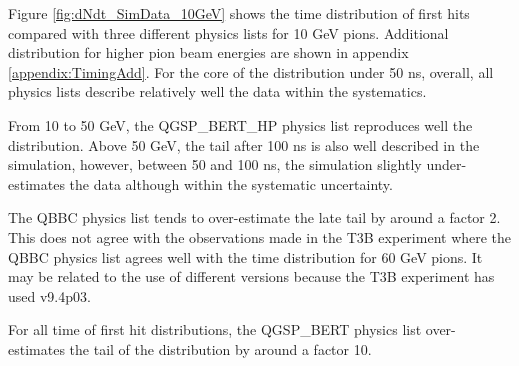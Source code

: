 Figure \ref{fig:dNdt_SimData_10GeV} shows the time distribution of first hits compared with three different physics lists for 10 GeV pions. Additional distribution for higher pion beam energies are shown in appendix \ref{appendix:TimingAdd}. For the core of the distribution under 50 ns, overall, all physics lists describe relatively well the data within the systematics.

From 10 to 50 GeV, the QGSP\_BERT\_HP physics list reproduces well the distribution. Above 50 GeV, the tail after 100 ns is also well described in the simulation, however, between 50 and 100 ns, the simulation slightly under-estimates the data although within the systematic uncertainty.

The QBBC physics list tends to over-estimate the late tail by around a factor 2. This does not agree with the observations made in the T3B experiment where the QBBC physics list agrees well with the time distribution for 60 GeV pions. It may be related to the use of different \geant versions because the T3B experiment has used \geant v9.4p03.

For all time of first hit distributions, the QGSP\_BERT physics list over-estimates the tail of the distribution by around a factor 10.

